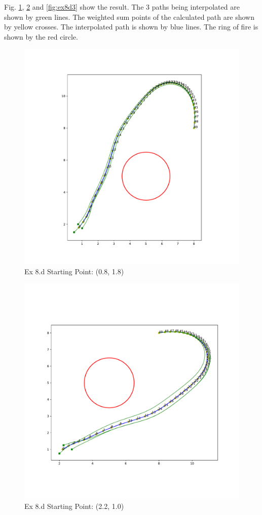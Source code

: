 \documentclass[
  course = {{16-811 Math Fundamentals for Robotics}},
  quartile = {{1}},
  assignment = 2,
  name = {{Kangle Deng}},
  email = {{kangled@andrew.cmu.edu}},
  firstexercise = 1
]{aga-homework}
\begin{document}
\subexercise
Fig. \ref{fig:ex8d1}, \ref{fig:ex8d2} and \ref{fig:ex8d3} show the result. The 3 paths being interpolated are shown by green lines. The weighted sum points of the calculated path are shown by yellow crosses. The interpolated path is shown by blue lines. The ring of fire is shown by the red circle.


\begin{figure}
    \centering
    \includegraphics[width=\linewidth]{math/fig/hw2/ex8c1.pdf}
    \caption{Ex 8.d Starting Point: (0.8, 1.8)}
    \label{fig:ex8d1}
\end{figure}

\begin{figure}
    \centering
    \includegraphics[width=\linewidth]{math/fig/hw2/ex8c2.pdf}
    \caption{Ex 8.d Starting Point: (2.2, 1.0)}
    \label{fig:ex8d2}
\end{figure}
\end{document}
